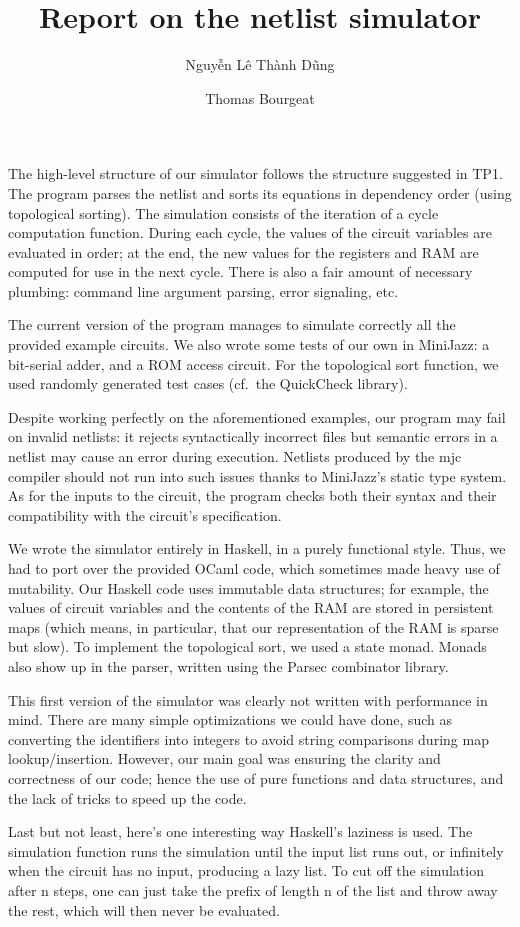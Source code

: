 \documentclass[a4paper, 11pt]{article}
\begin{document}
\title{Report on the netlist simulator}
\author{Nguyễn Lê Thành Dũng \and Thomas Bourgeat}
\maketitle



The high-level structure of our simulator follows the structure suggested in TP1. The program parses the netlist and sorts its equations in dependency order (using topological sorting). The simulation consists of the iteration of a cycle computation function. During each cycle, the values of the circuit variables are evaluated in order; at the end, the new values for the registers and RAM are computed for use in the next cycle. There is also a fair amount of necessary plumbing: command line argument parsing, error signaling, etc.

The current version of the program manages to simulate correctly all the provided example circuits. We also wrote some tests of our own in MiniJazz: a bit-serial adder, and a ROM access circuit. For the topological sort function, we used randomly generated test cases (cf.\ the QuickCheck library).

Despite working perfectly on the aforementioned examples, our program may fail on invalid netlists: it rejects syntactically incorrect files but semantic errors in a netlist may cause an error during execution. Netlists produced by the mjc compiler should not run into such issues thanks to MiniJazz's static type system. As for the inputs to the circuit, the program checks both their syntax and their compatibility with the circuit's specification.

We wrote the simulator entirely in Haskell, in a purely functional style. Thus, we had to port over the provided OCaml code, which sometimes made heavy use of mutability. Our Haskell code uses immutable data structures; for example, the values of circuit variables and the contents of the RAM are stored in persistent maps (which means, in particular, that our representation of the RAM is sparse but slow). To implement the topological sort, we used a state monad. Monads also show up in the parser, written using the Parsec combinator library.

This first version of the simulator was clearly not written with performance in mind. There are many simple optimizations we could have done, such as converting the identifiers into integers to avoid string comparisons during map lookup/insertion. However, our main goal was ensuring the clarity and correctness of our code; hence the use of pure functions and data structures, and the lack of tricks to speed up the code. 

Last but not least, here's one interesting way Haskell's laziness is used. The simulation function runs the simulation until the input list runs out, or infinitely when the circuit has no input, producing a lazy list. To cut off the simulation after n steps, one can just take the prefix of length n of the list and throw away the rest, which will then never be evaluated.
\end{document}
